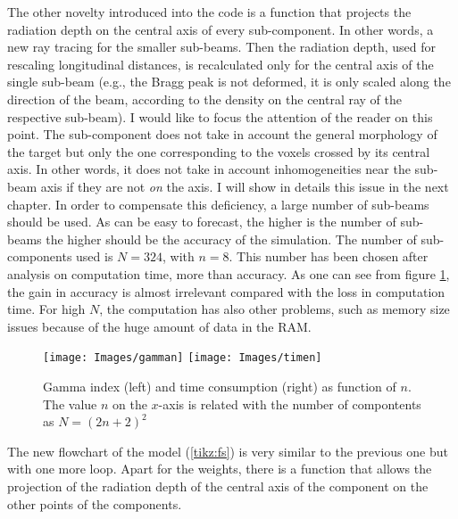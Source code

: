 \documentclass[12pt, a4paper, twoside]{book}
\begin{document}


The other novelty introduced into the code is a function that projects the radiation depth on the central axis of every sub-component. In other words, a new ray tracing for the smaller sub-beams.
Then the radiation depth, used for rescaling longitudinal distances, is recalculated only for the central axis of the single sub-beam (e.g., the Bragg peak is not deformed, it is only scaled along the direction of the beam, according to the density on the central ray of the respective sub-beam). I would like to focus the attention of the reader on this point. The sub-component does not take in account the general morphology of the target but only the one corresponding to the voxels crossed by its central axis. In other words, it does not take in account inhomogeneities near the sub-beam axis if they are not \emph{on} the axis. I will show in details this issue in the next chapter. 
In order to compensate this deficiency, a large number of sub-beams should be used. 
As can be easy to forecast, the higher is the number of sub-beams the higher should be the accuracy of the simulation. 
The number of sub-components used is $N=324$, with $n=8$. This number has been chosen after analysis on computation time, more than accuracy. As one can see from figure \ref{fig:gausn}, the gain in accuracy is almost irrelevant compared with the loss in computation time. For high $N$, the computation has also other problems, such as memory size issues because of the huge amount of data in the RAM.
\begin{figure}[t]
{\texttt{[image: Images/gamman]}}
{\texttt{[image: Images/timen]}}
\caption{Gamma index (left) and time consumption (right) as function of $n$. The value $n$ on the $x$-axis is related with the number of compontents as $N=(2n+2)^2$}
\label{fig:gausn}
\end{figure}

The new flowchart of the model (\ref{tikz:fs}) is very similar to the previous one but with one more loop.
Apart for the weights, there is a function that allows the projection of the radiation depth of the central axis of the component on the other points of the components.
\end{document}
